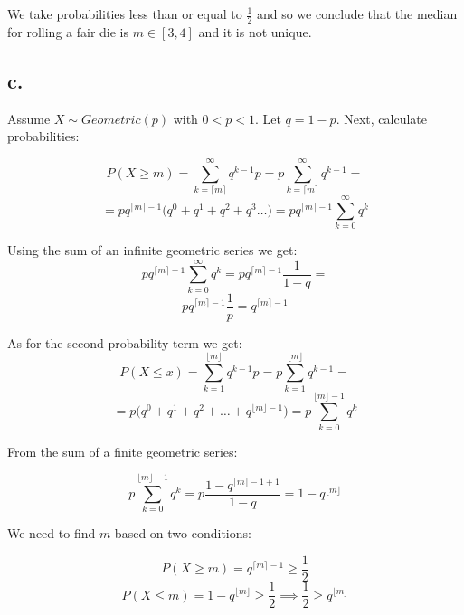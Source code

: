 \documentclass{article}
\begin{document}
We take probabilities less than or equal to \(\frac{1}{2}\) and so we conclude that the median for rolling a fair die
is \(m \in [3, 4]\) and it is not unique.

\subsection*{c.}

Assume \(X \sim Geometric(p)\) with \(0 < p < 1\). Let \(q = 1 - p\). Next, calculate probabilities:

\begin{equation*}
    P(X \geq m) = \sum_{k=\lceil m \rceil}^{\infty} q^{k-1}p = p \sum_{k=\lceil m \rceil}^{\infty} q^{k-1} =
\end{equation*}
\begin{equation*}
    = pq^{\lceil m \rceil - 1}\Big( q^{0} + q^{1} + q^{2} +  q^{3} \dots \Big) = pq^{\lceil m \rceil - 1} \sum_{k=0}^{\infty} q^{k}
\end{equation*}

Using the sum of an infinite geometric series we get:
\begin{equation*}
    pq^{\lceil m \rceil - 1} \sum_{k=0}^{\infty} q^{k} = pq^{\lceil m \rceil - 1}\frac{1}{1 - q} = 
\end{equation*}
\begin{equation*}
    pq^{\lceil m \rceil - 1}\frac{1}{p} = q^{\lceil m \rceil - 1}
\end{equation*}

As for the second probability term we get:
\begin{equation*}
    P(X \leq x) = \sum_{k=1}^{\lfloor m \rfloor} q^{k-1}p = p \sum_{k=1}^{\lfloor m \rfloor} q^{k-1} =
\end{equation*}
\begin{equation*}
    = p\Big( q^{0} + q^{1} + q^{2} + \dots + q^{\lfloor m \rfloor - 1} \Big) = p \sum_{k=0}^{\lfloor m \rfloor - 1} q^{k}
\end{equation*}

From the sum of a finite geometric series:

\begin{equation*}
    p \sum_{k=0}^{\lfloor m \rfloor - 1} q^{k} = p \frac{1 - q^{\lfloor m \rfloor - 1 + 1}}{1 - q} = 1 - q^{\lfloor m \rfloor}
\end{equation*}


We need to find \(m\) based on two conditions:

\begin{equation*}
    P(X \geq m) = q^{\lceil m \rceil - 1} \geq \frac{1}{2} \label{median_first_geo} \tag{*}
\end{equation*}
\begin{equation*}
    P(X \leq m) = 1 - q^{\lfloor m \rfloor} \geq \frac{1}{2} \implies \frac{1}{2} \geq q^{\lfloor m \rfloor} \label{median_second_geo} \tag{**}
\end{equation*}
\end{document}

